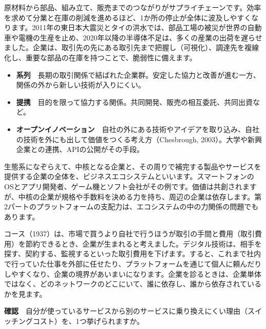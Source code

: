 \documentclass[paper=a4paper,fontsize=10pt,line_length=170mm,number_of_lines=46,baselineskip=1.6zw]{jlreq}
\newcommand\subhead[1]{\par\vspace{2.6mm}{\sffamily\bfseries\large #1}\par\vspace{1.3mm}}
\begin{document}
\subhead{サプライチェーンの相互依存と脆弱性}
原材料から部品、組み立て、販売までのつながりがサプライチェーンです。効率を求めて分業と在庫の削減を進めるほど、1か所の停止が全体に波及しやすくなります。2011年の東日本大震災とタイの洪水では、部品工場の被災が世界の自動車や電機の生産を止め、2020年以降の半導体不足は、多くの産業の出荷を遅らせました。企業は、取引先の先にある取引先まで把握し（可視化）、調達先を複線化し、重要な部品の在庫を持つことで、脆弱性に備えます。\par\vspace{1.2mm}
\subhead{系列・提携・オープンイノベーション}
\begin{itemize}[leftmargin=1.5em,itemsep=0.6mm,topsep=0.3mm]
\item {\sffamily\bfseries 系列}　長期の取引関係で結ばれた企業群。安定した協力と改善が進む一方、関係の外から新しい技術が入りにくい。
\item {\sffamily\bfseries 提携}　目的を限って協力する関係。共同開発、販売の相互委託、共同出資など。
\item {\sffamily\bfseries オープンイノベーション}　自社の外にある技術やアイデアを取り込み、自社の技術を外にも出して価値をつくる考え方（Chesbrough, 2003）。大学や新興企業との連携、APIの公開がその手段。
\end{itemize}\vspace{0.8mm}
\subhead{産業をエコシステムとして捉える}
生態系になぞらえて、中核となる企業と、その周りで補完する製品やサービスを提供する企業の全体を、ビジネスエコシステムといいます。スマートフォンのOSとアプリ開発者、ゲーム機とソフト会社がその例です。価値は共創されますが、中核の企業が規格や手数料を決める力を持ち、周辺の企業は依存します。第2パートのプラットフォームの支配力は、エコシステムの中の力関係の問題でもあります。\par\vspace{1.2mm}
\subhead{企業の境界はどこにあるのか}
コース（1937）は、市場で買うより自社で行うほうが取引の手間と費用（取引費用）を節約できるとき、企業が生まれると考えました。デジタル技術は、相手を探す、契約する、監視するといった取引費用を下げます。すると、これまで社内で行っていた仕事を外部に任せたり、プラットフォームを通じて個人に頼んだりしやすくなり、企業の境界があいまいになります。企業を診るときは、企業単体ではなく、どのネットワークのどこにいて、誰に依存し、誰から依存されているかを見ます。\par\vspace{1.2mm}
\begin{checkbox}
{\sffamily\bfseries 確認}　自分が使っているサービスから別のサービスに乗り換えにくい理由（スイッチングコスト）を、1つ挙げられますか。\par
\end{checkbox}
\end{document}
